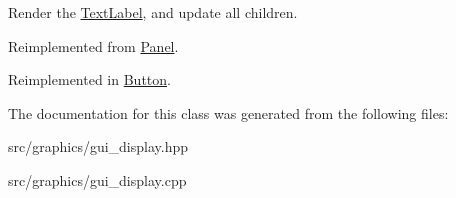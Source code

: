 Render the \mbox{\hyperlink{class_text_label}{Text\+Label}}, and update all children. 

Reimplemented from \mbox{\hyperlink{class_panel_a9e9c0608cf3139833cde6b73dc3ba443}{Panel}}.



Reimplemented in \mbox{\hyperlink{class_button_abda97f1ae8e081da3dbd0b77a27cad9d}{Button}}.



The documentation for this class was generated from the following files\+:\begin{DoxyCompactItemize}
\item 
src/graphics/gui\+\_\+display.\+hpp\item 
src/graphics/gui\+\_\+display.\+cpp\end{DoxyCompactItemize}

